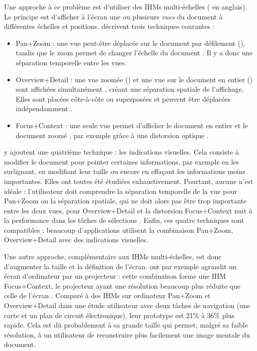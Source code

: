 Une approche à ce problème est d'utiliser des IHMs multi-échelles ( en anglais). Le principe est d'afficher à l'écran une ou plusieurs \emph{vues} du document à différentes échelles et positions. \cite{Guiard2004} décrivent trois techniques courantes :
\begin{itemize}
  \item Pan+Zoom : une vue peut-être déplacée sur le document par défilement (), tandis que le zoom permet de changer l'échelle du document . Il y a donc une séparation temporelle entre les vues.
  \item Overview+Detail : une vue zoomée () et une vue sur le document en entier () sont affichées simultanément , créant une séparation spatiale de l'affichage. Elles sont placées côte-à-côte ou superposées et peuvent être déplacées indépendamment .
  \item Focus+Context : une seule vue permet d'afficher le document en entier et le document zoomé , par exemple grâce à une distorsion optique .
\end{itemize}
\medskip

\cite{Cockburn2008} y ajoutent une quatrième technique : les indications visuelles. Cela consiste à modifier le document pour pointer certaines informations, par exemple en les surlignant, en modifiant leur taille ou encore en effaçant les informations moins importantes. Elles ont toutes été étudiées exhaustivement. Pourtant, aucune n'est idéale : l'utilisateur doit comprendre la séparation temporelle de la vue pour Pan+Zoom ou la séparation spatiale, qui ne doit alors pas être trop importante entre les deux vues, pour Overview+Detail et la distorsion Focus+Context nuit à la performance dans les tâches de sélections \citep{Cockburn2008}. Enfin, ces quatre techniques sont compatibles : beaucoup d'applications utilisent la combinaison Pan+Zoom, Overview+Detail avec des indications visuelles.

Une autre approche, complémentaire aux IHMs multi-échelles, est donc d'augmenter la taille et la définition de l'écran. \cite{Baudisch2002} ont par exemple agrandit un écran d'ordinateur par un projecteur : cette combinaison forme une IHM Focus+Context, le projecteur ayant une résolution beaucoup plus réduite que celle de l'écran . Comparé à des IHMs sur ordinateur Pan+Zoom et Overview+Detail dans une étude utilisateur avec deux tâches de navigation (une carte et un plan de circuit électronique), leur prototype est 21\% à 36\% plus rapide. Cela est dû probablement à sa grande taille qui permet, malgré sa faible résolution, à un utilisateur de reconstruire plus facilement une image mentale du document.

